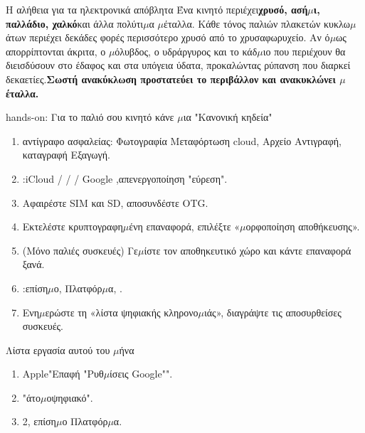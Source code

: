 \begin{tcbinfo}{Η αλήθεια για τα ηλεκτρονικά απόβλητα}
Ένα κινητό περιέχει\textbf{χρυσό, ασή$\mu$ι, παλλάδιο, χαλκό}και άλλα πολύτι$\mu$α $\mu$έταλλα. Κάθε τόνος παλιών πλακετών κυκλω$\mu$άτων περιέχει δεκάδες φορές περισσότερο χρυσό από το χρυσαφωρυχείο. Αν ό$\mu$ως απορρίπτονται άκριτα, ο $\mu$όλυβδος, ο υδράργυρος και το κάδ$\mu$ιο που περιέχουν θα διεισδύσουν στο έδαφος και στα υπόγεια ύδατα, προκαλώντας ρύπανση που διαρκεί δεκαετίες.\textbf{Σωστή ανακύκλωση προστατεύει το περιβάλλον και ανακυκλώνει $\mu$έταλλα.}

\end{tcbinfo}

\begin{tcbpractice}{hands-on: Για το παλιό σου κινητό κάνε $\mu$ια "Κανονική κηδεία"}
\begin{enumerate}
  \item αντίγραφο ασφαλείας: Φωτογραφία Μεταφόρτωση cloud, Αρχείο Αντιγραφή, καταγραφή Εξαγωγή.
  \item :iCloud / / / Google ,απενεργοποίηση "εύρεση".
  \item Αφαιρέστε SIM και SD, αποσυνδέστε OTG.
  \item Εκτελέστε κρυπτογραφη$\mu$ένη επαναφορά, επιλέξτε «$\mu$ορφοποίηση αποθήκευσης».
  \item (Μόνο παλιές συσκευές) Γε$\mu$ίστε τον αποθηκευτικό χώρο και κάντε επαναφορά ξανά.
  \item :επίση$\mu$ο, Πλατφόρ$\mu$α, .
  \item Ενη$\mu$ερώστε τη «λίστα ψηφιακής κληρονο$\mu$ιάς», διαγράψτε τις αποσυρθείσες συσκευές.
\end{enumerate}

\end{tcbpractice}

\begin{tcbpractice}{Λίστα εργασία αυτού του $\mu$ήνα}
\begin{enumerate}
  \item Apple"Επαφή "Ρυθ$\mu$ίσεις Google"".
  \item "άτο$\mu$οψηφιακό".
  \item 2, επίση$\mu$ο Πλατφόρ$\mu$α.
\end{enumerate}

\end{tcbpractice}
